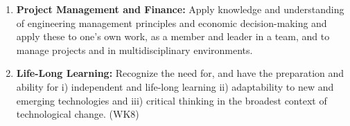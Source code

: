 \begin{enumerate}
    \item \textbf{Project Management and Finance:} Apply knowledge and understanding of engineering management principles and economic decision-making and apply these to one’s own work, as a member and leader in a team, and to manage projects and in multidisciplinary environments.
    \item \textbf{Life-Long Learning:} Recognize the need for, and have the preparation and ability for i) independent and life-long learning ii) adaptability to new and emerging technologies and iii) critical thinking in the broadest context of technological change. (WK8)


\end{enumerate}





\newpage